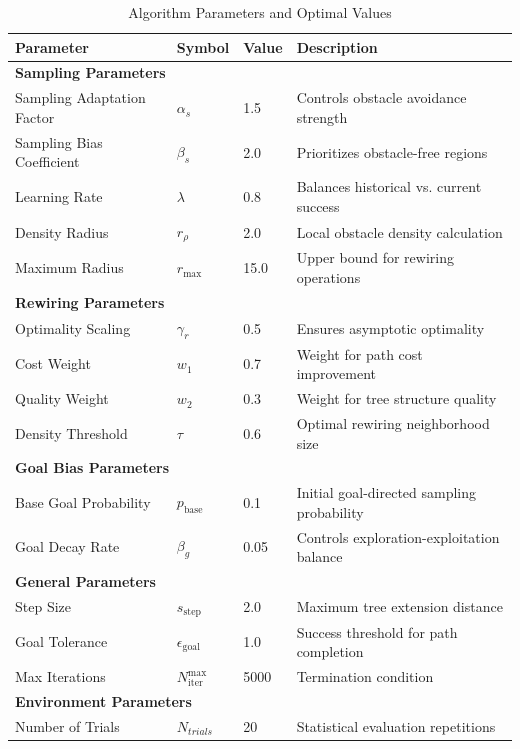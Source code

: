 \documentclass[pdflatex,sn-mathphys-num]{sn-jnl}
\theoremstyle{thmstyleone}%
\theoremstyle{thmstyletwo}%
\theoremstyle{thmstylethree}%
\begin{document}
\begin{table}[htbp]
\centering
\caption{Algorithm Parameters and Optimal Values}
\label{tab:comprehensive_parameters}
\begin{tabular}{llll}
\toprule
\textbf{Parameter} & \textbf{Symbol} & \textbf{Value} & \textbf{Description} \\
\midrule
\multicolumn{4}{l}{\textbf{Sampling Parameters}} \\
\midrule
Sampling Adaptation Factor & $\alpha_s$ & 1.5 & Controls obstacle avoidance strength \\
Sampling Bias Coefficient & $\beta_s$ & 2.0 & Prioritizes obstacle-free regions \\
Learning Rate & $\lambda$ & 0.8 & Balances historical vs. current success \\
Density Radius & $r_\rho$ & 2.0 & Local obstacle density calculation \\
Maximum Radius & $r_{\max}$ & 15.0 & Upper bound for rewiring operations \\
\midrule
\multicolumn{4}{l}{\textbf{Rewiring Parameters}} \\
\midrule
Optimality Scaling & $\gamma_r$ & 0.5 & Ensures asymptotic optimality \\
Cost Weight & $w_1$ & 0.7 & Weight for path cost improvement \\
Quality Weight & $w_2$ & 0.3 & Weight for tree structure quality \\
Density Threshold & $\tau$ & 0.6 & Optimal rewiring neighborhood size \\
\midrule
\multicolumn{4}{l}{\textbf{Goal Bias Parameters}} \\
\midrule
Base Goal Probability & $p_{\mathrm{base}}$ & 0.1 & Initial goal-directed sampling probability \\
Goal Decay Rate & $\beta_g$ & 0.05 & Controls exploration-exploitation balance \\
\midrule
\multicolumn{4}{l}{\textbf{General Parameters}} \\
\midrule
Step Size & $s_{\mathrm{step}}$ & 2.0 & Maximum tree extension distance \\
Goal Tolerance & $\epsilon_{\mathrm{goal}}$ & 1.0 & Success threshold for path completion \\
Max Iterations & $N_{\mathrm{iter}}^{\max}$ & 5000 & Termination condition \\
\midrule
\multicolumn{4}{l}{\textbf{Environment Parameters}} \\
\midrule
Number of Trials & $N_{trials}$ & 20 & Statistical evaluation repetitions \\
\bottomrule
\end{tabular}
\end{table}
\end{document}
